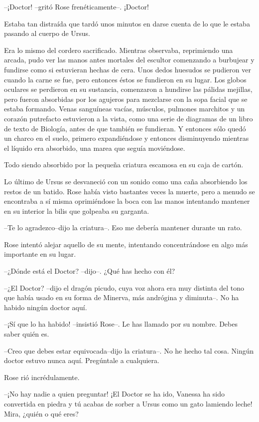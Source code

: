 --¡Doctor! --gritó Rose frenéticamente--. ¡Doctor!

Estaba tan distraída que tardó unos minutos en darse cuenta de lo que le
estaba pasando al cuerpo de Ursus.

Era lo mismo del cordero sacrificado. Mientras observaba, reprimiendo
una arcada, pudo ver las manos antes mortales del escultor comenzando a
burbujear y fundirse como si estuvieran hechas de cera. Unos dedos
huesudos se pudieron ver cuando la carne se fue, pero entonces éstos se
fundieron en su lugar. Los globos oculares se perdieron en su sustancia,
comenzaron a hundirse las pálidas mejillas, pero fueron absorbidas por
los agujeros para mezclarse con la sopa facial que se estaba formando.
Venas sanguíneas vacías, músculos, pulmones marchitos y un corazón
putrefacto estuvieron a la vista, como una serie de diagramas de un
libro de texto de Biología, antes de que también se fundieran. Y
entonces sólo quedó un charco en el suelo, primero expandiéndose y
entonces disminuyendo mientras el líquido era absorbido, una marea que
seguía moviéndose.

Todo siendo absorbido por la pequeña criatura escamosa en su caja de
cartón.

Lo último de Ursus se desvaneció con un sonido como una caña absorbiendo
los restos de un batido. Rose había visto bastantes veces la muerte,
pero a menudo se encontraba a sí misma oprimiéndose la boca con las
manos intentando mantener en su interior la bilis que golpeaba su
garganta.

--Te lo agradezco--dijo la criatura--. Eso me debería mantener durante
un rato.

Rose intentó alejar aquello de su mente, intentando concentrándose en
algo más importante en su lugar.

--¿Dónde está el Doctor? --dijo--. ¿Qué has hecho con él?

--¿El Doctor? --dijo el dragón picudo, cuya voz ahora era muy distinta
del tono que había usado en su forma de Minerva, más andrógina y
diminuta--. No ha habido ningún doctor aquí.

--¡Sí que lo ha habido! --insistió Rose--. Le has llamado por su nombre.
Debes saber quién es.

--Creo que debes estar equivocada--dijo la criatura--. No he hecho tal
cosa. Ningún doctor estuvo nunca aquí. Pregúntale a cualquiera.

Rose rió incrédulamente.

--¡No hay nadie a quien preguntar! ¡El Doctor se ha ido, Vanessa ha sido
convertida en piedra y tú acabas de sorber a Ursus como un gato lamiendo
leche! Mira, ¿quién o qué eres?

